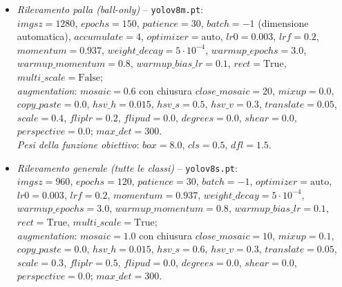 \documentclass[12pt,a4paper,openright,twoside]{book}
\begin{document}
\begin{itemize}
  \item \emph{Rilevamento palla (ball-only)} -- \texttt{yolov8m.pt}:\\
  $imgsz=1280$, $epochs=150$, $patience=30$, $batch=-1$ (dimensione
  automatica), $accumulate=4$, $optimizer=\text{auto}$, $lr0=0.003$,
  $lrf=0.2$, $momentum=0.937$, $weight\_decay=5\cdot10^{-4}$,
  $warmup\_epochs=3.0$, $warmup\_momentum=0.8$, $warmup\_bias\_lr=0.1$,
  $rect=\text{True}$, $multi\_scale=\text{False}$;\\
  \emph{augmentation}: $mosaic=0.6$ con chiusura $close\_mosaic=20$,
  $mixup=0.0$, $copy\_paste=0.0$, $hsv\_h=0.015$, $hsv\_s=0.5$,
  $hsv\_v=0.3$, $translate=0.05$, $scale=0.4$, $fliplr=0.2$,
  $flipud=0.0$, $degrees=0.0$, $shear=0.0$, $perspective=0.0$;
  $max\_det=300$.\\
  \textit{Pesi della funzione obiettivo}: $box=8.0$, $cls=0.5$,
  $dfl=1.5$.

  \item \emph{Rilevamento generale (tutte le classi)} -- \texttt{yolov8s.pt}:\\
  $imgsz=960$, $epochs=120$, $patience=30$, $batch=-1$,
  $optimizer=\text{auto}$, $lr0=0.003$, $lrf=0.2$, $momentum=0.937$,
  $weight\_decay=5\cdot10^{-4}$, $warmup\_epochs=3.0$,
  $warmup\_momentum=0.8$, $warmup\_bias\_lr=0.1$, $rect=\text{True}$,
  $multi\_scale=\text{True}$;\\
  \emph{augmentation}: $mosaic=1.0$ con chiusura $close\_mosaic=10$,
  $mixup=0.1$, $copy\_paste=0.0$, $hsv\_h=0.015$, $hsv\_s=0.6$,
  $hsv\_v=0.3$, $translate=0.05$, $scale=0.3$, $fliplr=0.5$,
  $flipud=0.0$, $degrees=0.0$, $shear=0.0$, $perspective=0.0$;
  $max\_det=300$.
\end{itemize}
\end{document}
